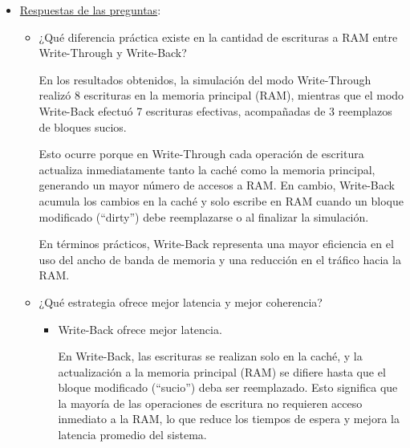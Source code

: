 \documentclass{article}
\begin{document}
\begin{itemize}
    \item  {\underline{Respuestas de las preguntas}:}

    \quad

    \begin{itemize}
    
        \item ¿Qué diferencia práctica existe en la cantidad de escrituras a RAM entre Write-Through y Write-Back?

        \quad
        
        {En los resultados obtenidos, la simulación del modo Write-Through realizó 8 escrituras en la memoria principal (RAM), mientras que el modo Write-Back efectuó 7 escrituras efectivas, acompañadas de 3 reemplazos de bloques sucios.}

        \quad

        {Esto ocurre porque en Write-Through cada operación de escritura actualiza inmediatamente tanto la caché como la memoria principal, generando un mayor número de accesos a RAM. En cambio, Write-Back acumula los cambios en la caché y solo escribe en RAM cuando un bloque modificado (“dirty”) debe reemplazarse o al finalizar la simulación.}
        
        \quad

        {En términos prácticos, Write-Back representa una mayor eficiencia en el uso del ancho de banda de memoria y una reducción en el tráfico hacia la RAM.}

        \quad

        \item ¿Qué estrategia ofrece mejor latencia y mejor coherencia?           

            \begin{itemize}

                \quad
                
                \item Write-Back ofrece mejor latencia.

                \quad
                
                {En Write-Back, las escrituras se realizan solo en la caché, y la actualización a la memoria principal (RAM) se difiere hasta que el bloque modificado (“sucio”) deba ser reemplazado. Esto significa que la mayoría de las operaciones de escritura no requieren acceso inmediato a la RAM, lo que reduce los tiempos de espera y mejora la latencia promedio del sistema.}

                \quad
                

\end{itemize}
\end{itemize}
\end{itemize}
\end{document}
